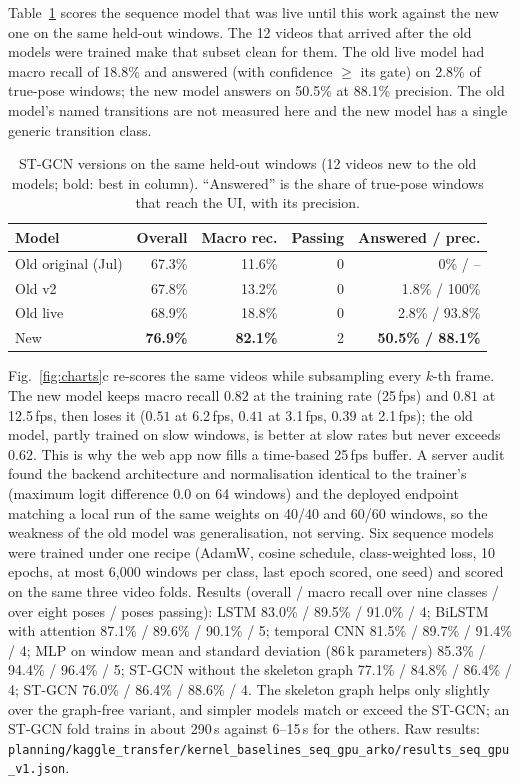  Table~\ref{tab:stgcn} scores the sequence model that was live until this work against the new one on the same held-out windows. The 12 videos that arrived after the old models were trained make that subset clean for them. The old live model had macro recall of 18.8\% and answered (with confidence $\ge$ its gate) on 2.8\% of true-pose windows; the new model answers on 50.5\% at 88.1\% precision. The old model's named transitions are not measured here and the new model has a single generic transition class.
\begin{table}[t]
\centering\footnotesize
\caption{ST-GCN versions on the same held-out windows (12 videos new to the old models; bold: best in column). ``Answered'' is the share of true-pose windows that reach the UI, with its precision.}\label{tab:stgcn}
\begin{tabular}{@{}lrrrr@{}}
\toprule
Model & Overall & Macro rec. & Passing & Answered / prec. \\ \midrule
Old original (Jul) & 67.3\% & 11.6\% & 0 & 0\% / -- \\
Old v2 & 67.8\% & 13.2\% & 0 & 1.8\% / 100\% \\
Old live & 68.9\% & 18.8\% & 0 & 2.8\% / 93.8\% \\
New & \textbf{76.9\%} & \textbf{82.1\%} & 2 & \textbf{50.5\% / 88.1\%} \\ \bottomrule
\end{tabular}
\end{table}

 Fig.~\ref{fig:charts}c re-scores the same videos while subsampling every $k$-th frame. The new model keeps macro recall $0.82$ at the training rate (25\,fps) and $0.81$ at 12.5\,fps, then loses it ($0.51$ at 6.2\,fps, $0.41$ at 3.1\,fps, $0.39$ at 2.1\,fps); the old model, partly trained on slow windows, is better at slow rates but never exceeds $0.62$. This is why the web app now fills a time-based 25\,fps buffer. A server audit found the backend architecture and normalisation identical to the trainer's (maximum logit difference 0.0 on 64 windows) and the deployed endpoint matching a local run of the same weights on 40/40 and 60/60 windows, so the weakness of the old model was generalisation, not serving.
 Six sequence models were trained under one recipe (AdamW, cosine schedule, class-weighted loss, 10 epochs, at most 6{,}000 windows per class, last epoch scored, one seed) and scored on the same three video folds. Results (overall / macro recall over nine classes / over eight poses / poses passing): LSTM 83.0\% / 89.5\% / 91.0\% / 4; BiLSTM with attention 87.1\% / 89.6\% / 90.1\% / 5; temporal CNN 81.5\% / 89.7\% / 91.4\% / 4; MLP on window mean and standard deviation (86\,k parameters) 85.3\% / 94.4\% / 96.4\% / 5; ST-GCN without the skeleton graph 77.1\% / 84.8\% / 86.4\% / 4; ST-GCN 76.0\% / 86.4\% / 88.6\% / 4. The skeleton graph helps only slightly over the graph-free variant, and simpler models match or exceed the ST-GCN; an ST-GCN fold trains in about 290\,s against 6--15\,s for the others. Raw results: \texttt{planning/kaggle\_transfer/kernel\_baselines\_seq\_gpu\_arko/results\_seq\_gpu\_v1.json}.

